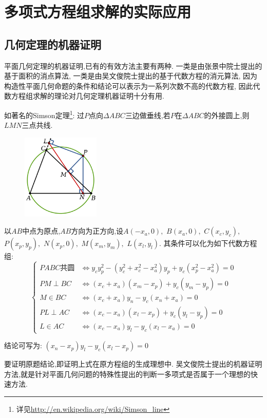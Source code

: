 \section{多项式方程组求解的实际应用}
\subsection{几何定理的机器证明}
	平面几何定理的机器证明,已有的有效方法主要有两种.
	一类是由张景中院士提出的基于面积的消点算法\cite{area_geo},
	一类是由吴文俊院士提出的基于代数方程的消元算法\cite{wwj},
	因为构造性平面几何命题的条件和结论可以表示为一系列次数不高的代数方程,
	因此代数方程组求解的理论对几何定理机器证明十分有用.
	
	如著名的Simson定理\footnote{详见\url{http://en.wikipedia.org/wiki/Simson_line}}:
	过$ P$点向$ \Delta ABC$三边做垂线,若$ P$在$ \Delta ABC$的外接圆上,则$  LMN$三点共线.
	\begin{figure}[h]
		\includegraphics[width=10em]{res/Simson.png}
	\end{figure}

	以$ AB$中点为原点,$AB$方向为正方向,设$ A(-x_a,0),$ $B(x_a,0),$ $C(x_c,y_c),$ $P(x_p,y_p),$ $N(x_p,0),$ $M(x_m,y_m),$ $L(x_l,y_l)$.
	其条件可以化为如下代数方程组:
	\[  \begin{cases}
		PABC\texttt{共圆} &\Leftrightarrow y_cy_p^2-(y_c^2+x_c^2-x_a^2)y_p+y_c(x_p^2-x_a^2) =0\\
		PM\perp BC &\Leftrightarrow (x_c+x_a)(x_m-x_p)+y_c(y_m-y_p) =0\\
		M \in BC &\Leftrightarrow (x_c + x_a)y_n - y_c(x_n+x_a) =0\\
		PL \perp AC &\Leftrightarrow (x_c-x_a)(x_l-x_p) + y_c(y_l-y_p) = 0\\
		L \in AC &\Leftrightarrow (x_c-x_a)y_l - y_c(x_l-x_a)  = 0
	\end{cases}\]

	结论可写为: 
	$ (x_n-x_p)y_l - y_c(x_l-x_p) = 0$

	要证明原题结论,即证明上式在原方程组的生成理想中.
	吴文俊院士提出的机器证明方法,就是针对平面几何问题的特殊性提出的判断一多项式是否属于一个理想的快速方法.

